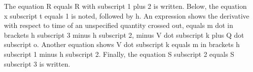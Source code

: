 The equation R equals R with subscript 1 plus 2 is written. Below, the equation x subscript t equals 1 is noted, followed by h. An expression shows the derivative with respect to time of an unspecified quantity crossed out, equals m dot in brackets h subscript 3 minus h subscript 2, minus V dot subscript k plus Q dot subscript o. Another equation shows V dot subscript k equals m in brackets h subscript 1 minus h subscript 2. Finally, the equation S subscript 2 equals S subscript 3 is written.
